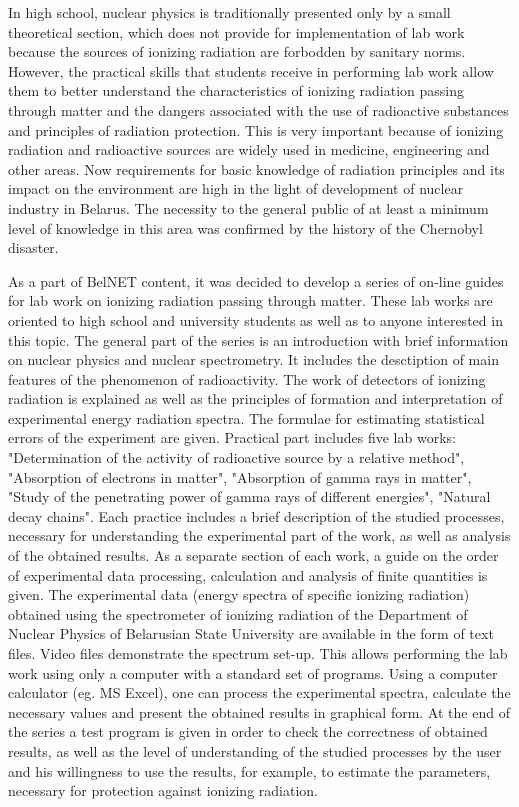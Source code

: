 \documentclass[12pt]{article}
\begin{document}
In high school, nuclear physics is traditionally presented only by
a small theoretical section, which does not provide for
implementation of lab work because the sources of ionizing
radiation are forbodden by sanitary norms. However, the practical
skills that students receive in performing lab work allow them to
better understand the characteristics of ionizing radiation
passing through matter and the dangers associated with the use of
radioactive substances and principles of radiation protection.
This is very important because of ionizing radiation and
radioactive sources are widely used in medicine, engineering and
other areas. Now requirements for basic knowledge of radiation
principles and its impact on the environment are high in the light
of development of nuclear industry in Belarus. The necessity to
the general public of at least a minimum level of knowledge in
this area was confirmed by the history of the Chernobyl disaster.

As a part of BelNET content, it was decided to develop a series of
on-line guides for lab work on ionizing radiation passing through
matter. These lab works are oriented to high school and university
students as well as to anyone interested in this topic. The
general part of the series is an introduction with brief
information on nuclear physics and nuclear spectrometry. It
includes the desctiption of main features of the phenomenon of
radioactivity. The work of detectors of ionizing radiation is
explained as well as the principles of formation and
interpretation of experimental energy radiation spectra. The
formulae for estimating statistical errors of the experiment are
given. Practical part includes five lab works: "Determination of
the activity of radioactive source by a relative method",
"Absorption of electrons in matter", "Absorption of gamma rays in
matter", "Study of the penetrating power of gamma rays of
different energies", "Natural decay chains". Each practice
includes a brief description of the studied processes, necessary
for understanding the experimental part of the work, as well as
analysis of the obtained results. As a separate section of each
work, a guide on the order of experimental data processing,
calculation and analysis of finite quantities is given. The
experimental data (energy spectra of specific ionizing radiation)
obtained using the spectrometer of ionizing radiation of the
Department of Nuclear Physics of Belarusian State University are
available in the form of text files. Video files demonstrate the
spectrum set-up. This allows performing the lab work using only a
computer with a standard set of programs. Using a computer
calculator (eg. MS Excel), one can process the experimental
spectra, calculate the necessary values and present the obtained
results in graphical form. At the end of the series a test program
is given in order to check the correctness of obtained results, as
well as the level of understanding of the studied processes by the
user and his willingness to use the results, for example, to
estimate the parameters, necessary for protection against ionizing
radiation.
\end{document}
